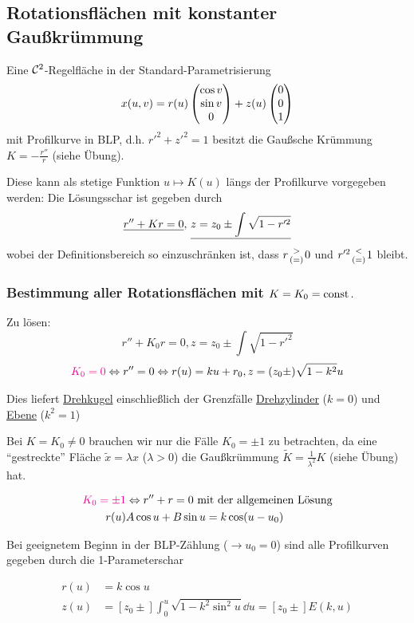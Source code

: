 \subsection{Rotationsflächen mit konstanter Gaußkrümmung}

Eine \(\mathcal{C}^2\)-Regelfläche in der Standard-Parametrisierung
\[
 x(u,v) = r(u) \begin{pmatrix} \cos v \\ \sin v \\ 0 \end{pmatrix}  + z(u) \begin{pmatrix} 0 \\ 0 \\ 1 \end{pmatrix} 
\]
mit Profilkurve in BLP, d.h. \uline{\(r'^2 + z'^2 = 1\)} besitzt die Gaußsche Krümmung \(K = -\frac{r''}{r}\) (siehe Übung). \par

Diese kann als stetige Funktion \(u \mapsto K(u)\) längs der Profilkurve vorgegeben werden: Die Lösungsschar ist gegeben durch
\[
 \uline{r'' + K r = 0}, \, \uline{z = z_0 \pm \int \sqrt{1 - r'^2}}
\]
wobei der Definitionsbereich so einzuschränken ist, dass \(r {>\atop(=)} 0\) und \(r'^2 {< \atop(=)}1\) bleibt.

\subsubsection{Bestimmung aller Rotationsflächen mit \(K = K_0 = \operatorname{const}.\)}

Zu lösen:
\[
 r'' + K_0 r = 0, z = z_0 \pm \int \sqrt{1 - r'^2}
\]
\begin{align*}
{\color{magenta}K_0 = 0}\Leftrightarrow r'' = 0 \Leftrightarrow r(u) = k u + r_0, z = (z_0 \pm) \sqrt{1-k^2} u
\end{align*}

Dies liefert \uline{Drehkugel} einschließlich der Grenzfälle \uline{Drehzylinder} (\(k = 0\)) und \uline{Ebene} (\(k^2 = 1\)) \par

Bei \(K = K_0 \ne 0\) brauchen wir nur die Fälle \(K_0 = \pm 1\) zu betrachten, da eine "`gestreckte"' Fläche \(\widetilde x = \lambda x\) (\(\lambda > 0\)) die Gaußkrümmung \(\widetilde K = \frac{1}{\lambda^2} K\) (siehe Übung) hat.

\begin{align*}
{\color{magenta}K_0 = \pm 1}&\Leftrightarrow r'' + r = 0 \text{ mit der allgemeinen Lösung} \\
r(u) & A \cos u + B \sin u = k \cos (u - u_0)
\end{align*}

Bei geeignetem Beginn in der BLP-Zählung (\(\to u_0 = 0\)) sind alle Profilkurven gegeben durch die 1-Parameterschar

\begin{align*}
 r(u) &= k \cos u \\
 z(u) &= [z_0 \pm] \int_0^u \sqrt{1 - k^2 \sin^2 u} \dd u = [z_0 \pm] E(k,u)
\end{align*}

